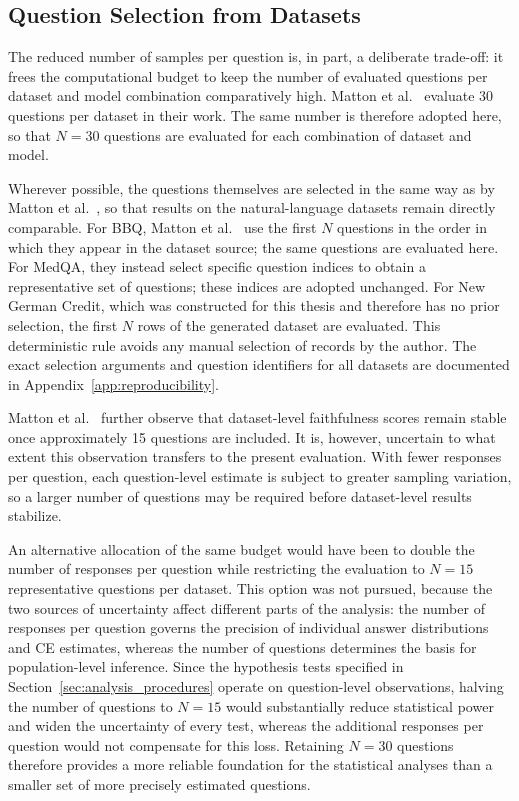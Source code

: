 \subsection{Question Selection from Datasets}
\label{sec:questions_per_dataset}
The reduced number of samples per question is, in part, a deliberate trade-off: it frees the computational budget to keep the number of evaluated questions per dataset and model combination comparatively high. Matton et al.~\cite{mattonWalkTalkMeasuring2024} evaluate 30 questions per dataset in their work. The same number is therefore adopted here, so that $N=30$ questions are evaluated for each combination of dataset and model.

Wherever possible, the questions themselves are selected in the same way as by Matton et al.~\cite{mattonWalkTalkMeasuring2024}, so that results on the natural-language datasets remain directly comparable. For BBQ, Matton et al.~\cite{mattonWalkTalkMeasuring2024} use the first $N$ questions in the order in which they appear in the dataset source; the same questions are evaluated here. For MedQA, they instead select specific question indices to obtain a representative set of questions; these indices are adopted unchanged. For New German Credit, which was constructed for this thesis and therefore has no prior selection, the first $N$ rows of the generated dataset are evaluated. This deterministic rule avoids any manual selection of records by the author. The exact selection arguments and question identifiers for all datasets are documented in Appendix~\ref{app:reproducibility}.

Matton et al.~\cite{mattonWalkTalkMeasuring2024} further observe that dataset-level faithfulness scores remain stable once approximately 15 questions are included. It is, however, uncertain to what extent this observation transfers to the present evaluation. With fewer responses per question, each question-level estimate is subject to greater sampling variation, so a larger number of questions may be required before dataset-level results stabilize.

An alternative allocation of the same budget would have been to double the number of responses per question while restricting the evaluation to $N=15$ representative questions per dataset. This option was not pursued, because the two sources of uncertainty affect different parts of the analysis: the number of responses per question governs the precision of individual answer distributions and CE estimates, whereas the number of questions determines the basis for population-level inference. Since the hypothesis tests specified in Section~\ref{sec:analysis_procedures} operate on question-level observations, halving the number of questions to $N=15$ would substantially reduce statistical power and widen the uncertainty of every test, whereas the additional responses per question would not compensate for this loss. Retaining $N=30$ questions therefore provides a more reliable foundation for the statistical analyses than a smaller set of more precisely estimated questions.

